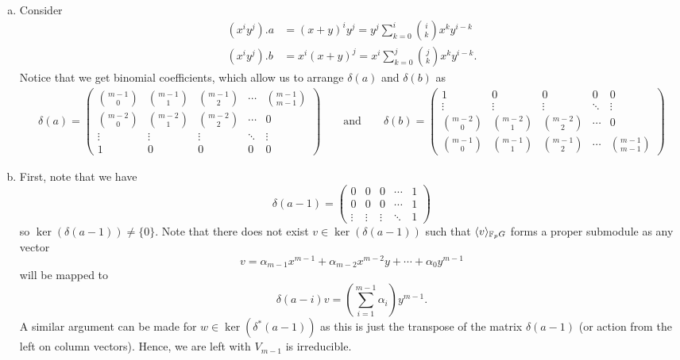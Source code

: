 \documentclass[leqno]{article}
\begin{document}
\begin{solution}~
\begin{enumerate}[(a)]
    \item Consider 
    \begin{align*}
        (x^i y^j).a &= (x+y)^i y^j = y^j \sum_{k=0}^i \binom{i}{k}x^k y^{i-k}\\
        (x^i y^j).b &= x^i (x+y)^j = x^i \sum_{k=0}^j \binom{j}{k}x^k y^{i-k}.
    \end{align*}
    Notice that we get binomial coefficients, which allow us to arrange $\delta(a)$ and $\delta(b)$ as 
    \begin{align*}
        \delta(a)=\begin{pmatrix} \binom{m-1}{0} & \binom{m-1}{1} & \binom{m-1}{2} & \cdots & \binom{m-1}{m-1}\\ 
        \binom{m-2}{0} & \binom{m-2}{1} & \binom{m-2}{2} & \cdots & 0 \\
        \vdots & \vdots & \vdots & \ddots & \vdots \\
        1 & 0 & 0 & 0 & 0\end{pmatrix} \qquad \textrm{and} \qquad \delta(b)=\begin{pmatrix}          1 & 0 & 0 & 0 & 0\\
        \vdots & \vdots & \vdots & \ddots & \vdots \\
    \binom{m-2}{0} & \binom{m-2}{1} & \binom{m-2}{2} & \cdots & 0 \\
        \binom{m-1}{0} & \binom{m-1}{1} & \binom{m-1}{2} & \cdots & \binom{m-1}{m-1}\end{pmatrix}
    \end{align*}
    \item First, note that we have
    \[
    \delta(a-1) = \begin{pmatrix} 0 & 0 & 0 & \cdots & 1\\ 0 & 0 & 0 &\cdots & 1 \\ \vdots & \vdots & \vdots & \ddots & 1\end{pmatrix}
    \]
    so $\ker (\delta(a-1))\neq \{0\}$.  Note that there does not exist $v\in \ker (\delta(a-1))$ such that $\langle v \rangle_{\mathbb{F}_p G}$ forms a proper submodule as any vector 
    \[
    v = \alpha_{m-1}x^{m-1} + \alpha_{m-2}x^{m-2}y + \cdots + \alpha_{0}y^{m-1}
    \]
    will be mapped to 
    \[
    \delta(a-i)v = \left(\sum_{i=1}^{m-1}\alpha_{i}\right) y^{m-1}.
    \]
    A similar argument can be made for $w\in \ker (\delta^*(a-1))$ as this is just the transpose of the matrix $\delta(a-1)$ (or action from the left on column vectors).  Hence, we are left with $V_{m-1}$ is irreducible.
\end{enumerate}
\end{solution}
\end{document}
